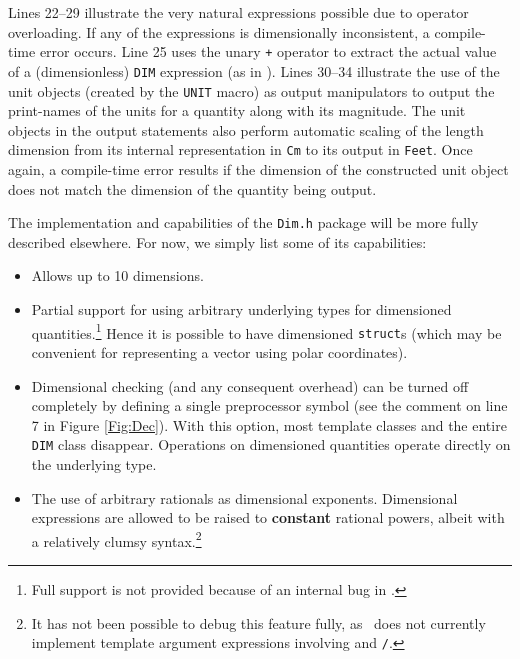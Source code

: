 Lines 22--29 illustrate the very natural expressions possible due
to operator overloading.  If any of the expressions is
dimensionally inconsistent, a compile-time error occurs.  Line 25
uses the unary {\tt +} operator to extract the actual value of a
(dimensionless) {\tt DIM} expression (as in \cite{hilfinger:88}).
Lines 30--34 illustrate the use of the unit objects (created by
the {\tt UNIT} macro) as output manipulators to output the
print-names of the units for a quantity along with its magnitude.
The unit objects in the output statements also perform automatic
scaling of the length dimension from its internal representation
in {\tt Cm} to its output in {\tt Feet}.  Once again, a
compile-time error results if the dimension of the constructed
unit object does not match the dimension of the quantity being
output.

The implementation and capabilities of the {\tt Dim.h} package
will be more fully described elsewhere.  For now, we simply list
some of its capabilities:

\begin{itemize}

\item Allows up to 10 dimensions.

\item Partial support for using arbitrary underlying types for
dimensioned quantities.\footnote{Full support is not provided
because of an internal bug in \gpp.}  Hence it is possible to have
dimensioned {\tt struct}s (which may be convenient for
representing a vector using polar coordinates).

\item Dimensional checking (and any consequent overhead) can be
turned off completely by defining a single preprocessor symbol
(see the comment on line 7 in Figure \ref{Fig:Dec}).  With this
option, most template classes and the entire {\tt DIM} class
disappear.  Operations on dimensioned quantities operate directly
on the underlying type.

\item The use of arbitrary rationals as dimensional exponents.
Dimensional expressions are allowed to be raised to {\bf constant}
rational powers, albeit with a relatively clumsy
syntax.\footnote{It has not been possible to debug this feature
fully, as \gpp\ does not currently implement template argument
expressions involving {\tt *} and {\tt /}.}

\end{itemize}

